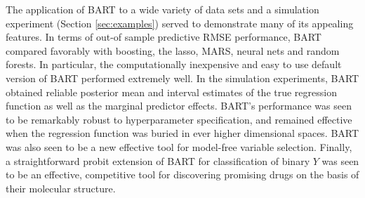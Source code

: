 \documentclass[aoas,nameyear,dvips]{arximspdf}
\begin{document}
The application of BART to a wide variety of data sets and a simulation
experiment (Section \ref{sec:examples}) served to demonstrate many of
its appealing features. In terms of out-of sample predictive RMSE
performance, BART compared favorably with boosting, the lasso, MARS,
neural nets and random forests.  In particular, the computationally
inexpensive and easy to use default version of BART performed extremely
well. In the simulation experiments, BART obtained reliable posterior
mean and interval estimates of the true regression function as well as
the marginal predictor effects.  BART's performance was seen to be
remarkably robust to hyperparameter specification, and remained
effective when the regression function was buried in ever higher
dimensional spaces. BART was also seen to be a new effective tool for
model-free variable selection.  Finally, a straightforward probit
extension of BART for classification of binary $Y$ was seen to be an
effective, competitive tool for discovering promising drugs on the
basis of their molecular structure.
\end{document}
